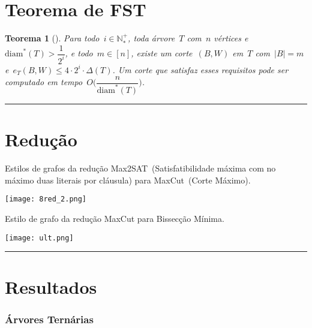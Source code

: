 \documentclass[a0,portrait]{a0poster}
\newtheorem{teo}{Teorema}
\newcommand{\diam}{\mathrm{diam}}
\begin{document}
\begin{multicols}{3}
\section*{Teorema de FST}

\begin{teo}[]
\label{teo:corteExato}
    Para todo~${i\in \mathbb{N^+_*}}$, toda árvore~$T$ com~$n$
    vértices e~${\diam^*(T)>\dfrac{1}{2^i}}$, e todo~${m\in[n]}$,
    existe um corte~$(B,W)$ em~$T$ com~${|B|=m}$ 
    e~$e_T(B,W)\le 4\cdot 2^i\cdot \Delta(T)$.
    Um corte que satisfaz esses requisitos pode ser computado
    em tempo~${O\Big(\dfrac{n}{\diam^*(T)}\Big)}$.
\end{teo}

\noindent\rule[0.5ex]{\linewidth}{1pt}


\section*{Redução}

    Estilos de grafos da redução Max2SAT~(Satisfatibilidade
    máxima 
    com no máximo duas literais por cláusula) para
    MaxCut~(Corte Máximo).
\begin{center}
\texttt{[image: 8red\_2.png]}
\end{center}
Estilo de grafo da redução MaxCut para Bissecção Mínima.
    
\begin{center}
\texttt{[image: ult.png]}
\end{center}
\noindent\rule[0.5ex]{\linewidth}{1pt}

\section*{Resultados}
\subsubsection*{Árvores Ternárias}

    \begin{tabular}{| c | c | >{}P{3.6cm} | >{}P{3.6cm} | >{}P{5cm} | >{}P{5.1cm} | }


\end{tabular}
\end{multicols}
\end{document}
